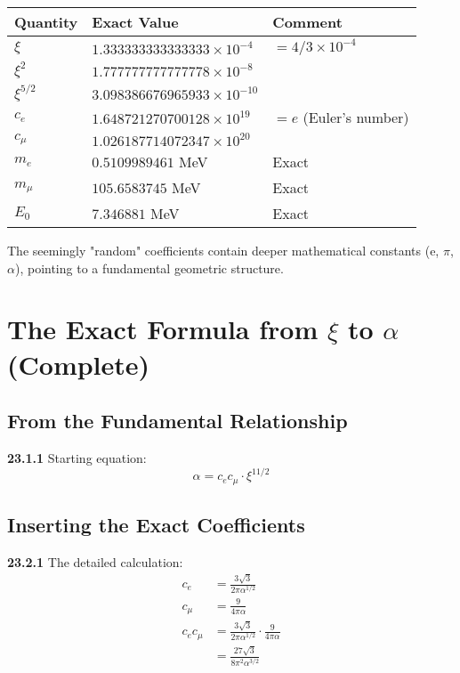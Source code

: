 \documentclass[12pt,a4paper]{article}
\begin{document}
\begin{table}[h]
	\centering
	\begin{tabular}{lll}
		\toprule
		Quantity & Exact Value & Comment \\
		\midrule
		$\xi$ & $1.333333333333333 \times 10^{-4}$ & $= 4/3 \times 10^{-4}$ \\
		$\xi^2$ & $1.777777777777778 \times 10^{-8}$ & \\
		$\xi^{5/2}$ & $3.098386676965933 \times 10^{-10}$ & \\
		$c_e$ & $1.648721270700128 \times 10^{19}$ & $= e$ (Euler's number) \\
		$c_\mu$ & $1.026187714072347 \times 10^{20}$ & \\
		$m_e$ & $0.5109989461$ MeV & Exact \\
		$m_\mu$ & $105.6583745$ MeV & Exact \\
		$E_0$ & $7.346881$ MeV & Exact \\
		\bottomrule
	\end{tabular}
\end{table}

The seemingly "random" coefficients contain deeper mathematical constants (e, $\pi$, $\alpha$), pointing to a fundamental geometric structure.
\section{The Exact Formula from $\xi$ to $\alpha$ (Complete)}

\subsection{From the Fundamental Relationship}
\noindent \textbf{23.1.1} Starting equation:
\begin{equation}
	\alpha = c_e c_\mu \cdot \xi^{11/2}
\end{equation}

\subsection{Inserting the Exact Coefficients}
\noindent \textbf{23.2.1} The detailed calculation:
\begin{align}
	c_e &= \frac{3\sqrt{3}}{2\pi\alpha^{1/2}} \\
	c_\mu &= \frac{9}{4\pi\alpha} \\
	c_e c_\mu &= \frac{3\sqrt{3}}{2\pi\alpha^{1/2}} \cdot \frac{9}{4\pi\alpha} \\
	&= \frac{27\sqrt{3}}{8\pi^2\alpha^{3/2}}
\end{align}
\end{document}
